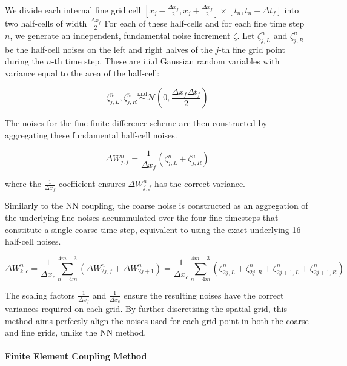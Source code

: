 We divide each internal fine grid cell 
$[x_{j}-\frac{\Delta x_f}{2}, 
x_{j}+\frac{\Delta x_f}{2}]
\times [t_n, t_n + \Delta t_f]$ into
two half-cells of width $\frac{\Delta x_f}{2}$ 
For each of these half-cells and for each fine time
step $n$, we generate an independent, fundamental 
noise increment $\zeta$. Let $\zeta_{j,L}^n$ and 
$\zeta_{j,R}^n$ be the half-cell noises on the left 
and right halves of the $j$-th fine grid point
during the $n$-th time step. These are 
i.i.d Gaussian random variables with variance 
equal to the area of the half-cell:

\begin{equation}
    \zeta_{j,L}^n, \zeta_{j, R}^n 
    \overset{\mathrm{i.i.d}}{\sim} 
    \mathcal{N}(0, \frac{\Delta x_f \Delta t_f}{2})
\end{equation}

The noises for the fine finite difference 
scheme are then constructed by aggregating 
these fundamental half-cell noises.

\begin{equation}
    \Delta W_{j,f}^n = \frac{1}{\Delta x_f} 
    (\zeta_{j,L}^n + \zeta_{j,R}^n)
\end{equation}

where the $\frac{1}{\Delta x_f}$ coefficient 
ensures $\Delta W_{j,f}^n$ has the correct variance. 

Similarly to the NN coupling, the coarse noise 
is constructed as an aggregation of 
the underlying fine noises accummulated over the
four fine timesteps that constitute a single
coarse time step, equivalent to using the 
exact underlying 16 half-cell noises.

\begin{equation}
    \Delta W_{k, c}^n = \frac{1}{\Delta x_c}
    \sum_{n=4m}^{4m+3} \left(\Delta W_{2j,f}^n + 
    \Delta W_{2j+1}^n\right) = \frac{1}{\Delta x_c}
    \sum_{n=4m}^{4m+3} \left(\zeta_{2j,L}^n + 
    \zeta_{2j, R}^n + \zeta_{2j+1,L}^n + 
    \zeta_{2j+1,R}^n\right)
\end{equation}

The scaling factors $\frac{1}{\Delta x_f}$ and 
$\frac{1}{\Delta x_c}$ ensure the resulting
noises have the correct variances required on 
each grid. 
By further discretising the spatial grid, 
this method aims perfectly align the noises 
used for each grid point in both the coarse
and fine grids, unlike the NN method.


\paragraph{Finite Element Coupling Method}

